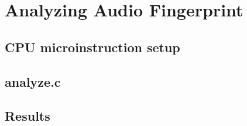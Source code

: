 \chapter{Analyzing Audio Fingerprint}
\label{chp:analyzing} 

\section{CPU microinstruction setup}\label{sec:cpu_microinstruction_setup}


\section{analyze.c}\label{sec:analyse}


\section{Results}\label{sec:results}
